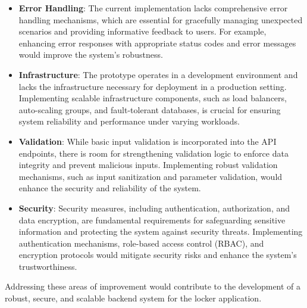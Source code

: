 \begin{itemize}
    \item \textbf{Error Handling}: The current implementation lacks comprehensive error handling mechanisms, which are essential for gracefully managing unexpected scenarios and providing informative feedback to users. For example, enhancing error responses with appropriate status codes and error messages would improve the system's robustness.

    \item \textbf{Infrastructure}: The prototype operates in a development environment and lacks the infrastructure necessary for deployment in a production setting. Implementing scalable infrastructure components, such as load balancers, auto-scaling groups, and fault-tolerant databases, is crucial for ensuring system reliability and performance under varying workloads.

    \item \textbf{Validation}: While basic input validation is incorporated into the API endpoints, there is room for strengthening validation logic to enforce data integrity and prevent malicious inputs. Implementing robust validation mechanisms, such as input sanitization and parameter validation, would enhance the security and reliability of the system.

    \item \textbf{Security}: Security measures, including authentication, authorization, and data encryption, are fundamental requirements for safeguarding sensitive information and protecting the system against security threats. Implementing authentication mechanisms, role-based access control (RBAC), and encryption protocols would mitigate security risks and enhance the system's trustworthiness.
\end{itemize}

Addressing these areas of improvement would contribute to the development of a robust, secure, and scalable backend system for the locker application.


